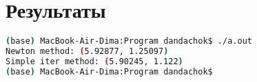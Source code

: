 \section*{Результаты}

\begin{lstlisting}[language=bash]
(base) MacBook-Air-Dima:Program dandachok$ ./a.out
Newton method: (5.92877, 1.25097)
Simple iter method: (5.90245, 1.122)
(base) MacBook-Air-Dima:Program dandachok$ 
\end{lstlisting}


\pagebreak